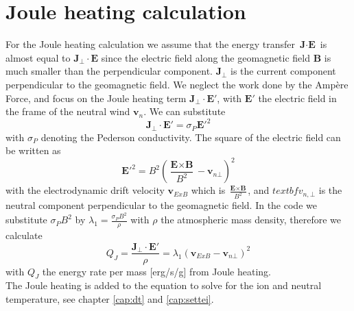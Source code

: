 %
\section{Joule heating calculation}
%
For the Joule heating calculation we assume that the energy transfer
$\textbf{J} \cdot \textbf{E}$ is almost equal to $\textbf{J}_{\bot}
\cdot \textbf{E}$ since the electric field along the geomagnetic
field $\textbf{B}$ is much smaller than the perpendicular component.
$\textbf{J}_{\bot}$ is the current component perpendicular to the
geomagnetic field. We neglect the work done by the Amp\`{e}re Force,
and focus on the Joule heating term $\textbf{J}_{\bot} \cdot
\textbf{E}'$, with $\textbf{E}'$ the electric field in the frame of
the neutral wind $\textbf{v}_n$. We can substitute
%
\begin{equation}
 \textbf{J}_{\bot} \cdot \textbf{E}' = \sigma_P \textbf{E}'^2
\end{equation}
%
with $\sigma_P$ denoting the Pederson conductivity. The square of
the electric field can be written as
%
\begin{equation}
  \textbf{E}'^2 = B^2(\frac{\textbf{E} \times \textbf{B}}{B^2}-
  \textbf{v}_{n\bot})^2
\end{equation}
%
with the electrodynamic drift velocity $\textbf{v}_{ExB}$ which is
$\frac{\textbf{E} \times \textbf{B}}{B^2}$, and $textbf{v}_{n,\bot}$
is the neutral component perpendicular to the geomagnetic field. In
the code we substitute $\sigma_P B^2$ by $\lambda_1 = \frac{\sigma_P
B^2}{\rho}$ with $\rho$ the atmospheric mass density, therefore we
calculate
%
\begin{equation}
  Q_J = \frac{\textbf{J}_{\bot} \cdot \textbf{E}'}{\rho} =
  \lambda_1 (\textbf{v}_{ExB}- \textbf{v}_{n\bot})^2
\end{equation}
%
with $Q_J$ the energy rate per mass [erg/s/g] from Joule heating. \\

The Joule heating is added to the equation to solve for the ion and
neutral temperature, see chapter \ref{cap:dt} and \ref{cap:settei}.
\\

